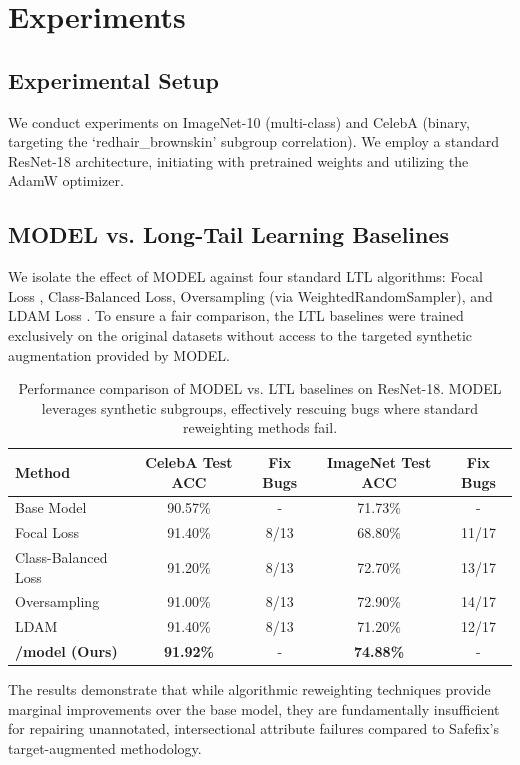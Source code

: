 \documentclass{article}
\newcommand{\model}{MODEL\xspace}
\begin{document}
\section{Experiments}

\subsection{Experimental Setup}
We conduct experiments on ImageNet-10 (multi-class) and CelebA (binary, targeting the `redhair\_brownskin' subgroup correlation). We employ a standard ResNet-18 architecture, initiating with pretrained weights and utilizing the AdamW optimizer. 

\subsection{\model vs. Long-Tail Learning Baselines}

We isolate the effect of \model against four standard LTL algorithms: Focal Loss \citep{lin2017focal}, Class-Balanced Loss, Oversampling (via WeightedRandomSampler), and LDAM Loss \citep{cao2019learning}. To ensure a fair comparison, the LTL baselines were trained exclusively on the original datasets without access to the targeted synthetic augmentation provided by \model.

\begin{table}[h]
\caption{Performance comparison of \model vs. LTL baselines on ResNet-18. \model leverages synthetic subgroups, effectively rescuing bugs where standard reweighting methods fail.}
\centering
\begin{tabular}{l cc cc}
\toprule
\textbf{Method} & \textbf{CelebA Test ACC} & \textbf{Fix Bugs} & \textbf{ImageNet Test ACC} & \textbf{Fix Bugs} \\
\midrule
Base Model & 90.57\% & - & 71.73\% & - \\
Focal Loss & 91.40\% & 8/13 & 68.80\% & 11/17 \\
Class-Balanced Loss & 91.20\% & 8/13 & 72.70\% & 13/17 \\
Oversampling & 91.00\% & 8/13 & 72.90\% & 14/17 \\
LDAM & 91.40\% & 8/13 & 71.20\% & 12/17 \\
\midrule
\textbf{/model (Ours)} & \textbf{91.92\%} & - & \textbf{74.88\%} & - \\
\bottomrule
\end{tabular}
\end{table}

The results demonstrate that while algorithmic reweighting techniques provide marginal improvements over the base model, they are fundamentally insufficient for repairing unannotated, intersectional attribute failures compared to Safefix's target-augmented methodology.
\end{document}

